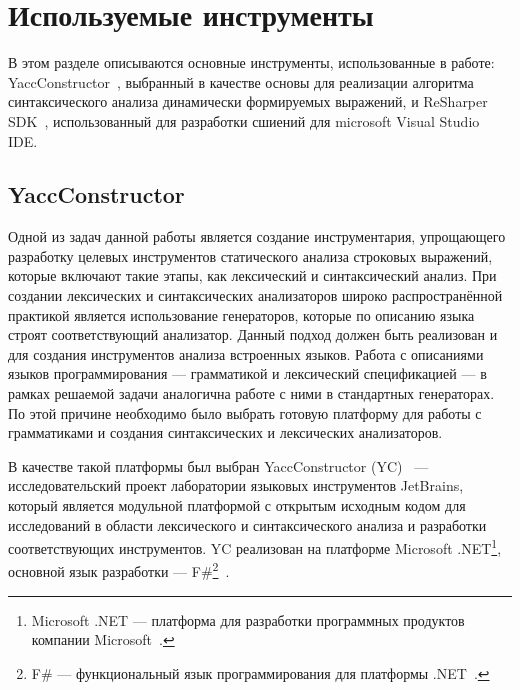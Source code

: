     
\section{Используемые инструменты}

В этом разделе описываются основные инструменты, использованные в работе: YaccConstructor~\cite{YCArticle, YCUrl}, выбранный в качестве основы для реализации алгоритма синтаксического анализа динамически формируемых выражений, и ReSharper SDK~\cite{ReSharperSDK}, использованный для разработки сшиений для microsoft Visual Studio IDE.  

\subsection{YaccConstructor}\label{YCDescr}

    Одной из задач данной работы является создание инструментария, упрощающего разработку целевых инструментов статического анализа строковых выражений, которые включают такие этапы, как лексический и синтаксический анализ. При создании лексических и синтаксических анализаторов широко распространённой практикой является использование генераторов, которые по описанию языка строят соответствующий анализатор. Данный подход должен быть реализован и для создания инструментов анализа встроенных языков.
    Работа с описаниями языков программирования --- грамматикой и лексический спецификацией --- в рамках решаемой задачи аналогична работе с ними в стандартных генераторах. По этой причине необходимо было выбрать готовую платформу для работы с грамматиками и создания синтаксических и лексических анализаторов.

    В качестве такой платформы был выбран YaccConstructor (YC)~\cite{YCArticle, YCUrl} --- исследовательский проект лаборатории языковых инструментов JetBrains, который является модульной платформой с открытым исходным кодом для исследований в области лексического и синтаксического анализа и разработки соответствующих инструментов. YC реализован на платформе Microsoft .NET\footnote{Microsoft .NET --- платформа для разработки программных продуктов компании Microsoft~\cite{MSNETURL}.}, основной язык разработки --- F\#\footnote{F\# --- функциональный язык программирования для платформы .NET~\cite{FSharpURL}.}~\cite{FSharp}.

